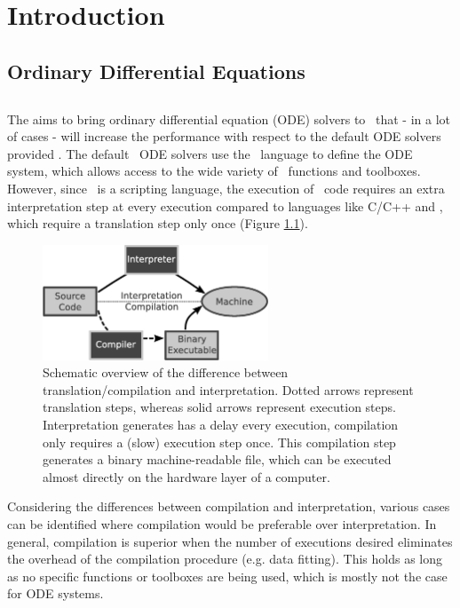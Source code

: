 \chapter[Introduction]{Introduction}
\section{Ordinary Differential Equations}


\section{\PPODESUITE}
The \PPODESUITE aims to bring ordinary differential equation (ODE) solvers to \MATLAB~that - in a lot of cases - will increase the performance with respect to the default ODE solvers provided \MATLAB. The default \MATLAB~ODE solvers use the \MATLAB~language to define the ODE system, which allows access to the wide variety of \MATLAB~functions and toolboxes. However, since \MATLAB~is a scripting language, the execution of \MATLAB~code requires an extra interpretation step at every execution compared to languages like C/C++ and \Fortran, which require a translation step only once (Figure \ref{fig:InterpretationVSCompilation}).
\begin{figure}[hb]
 \centering
 \includegraphics[width=0.6\textwidth]{./graphics/interpreter-vs-compiler.eps}
 \caption{Schematic overview of the difference between translation/compilation and interpretation. Dotted arrows represent translation steps, whereas solid arrows represent execution steps. Interpretation generates has a delay every execution, compilation only requires a (slow) execution step once. This compilation step generates a binary machine-readable file, which can be executed almost directly on the hardware layer of a computer.}
 \label{fig:InterpretationVSCompilation}
\end{figure}

Considering the differences between compilation and interpretation, various cases can be identified where compilation would be preferable over interpretation. In general, compilation is superior when the number of executions desired eliminates the overhead of the compilation procedure (e.g. data fitting). This holds as long as no \MATLAB specific functions or toolboxes are being used, which is mostly not the case for ODE systems.

